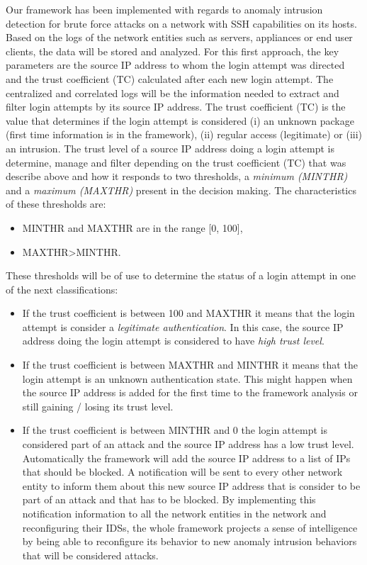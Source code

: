 \documentclass[conference]{IEEEtran}
\begin{document}
Our framework has been implemented with regards to anomaly intrusion detection for brute force attacks on a network with SSH capabilities on its hosts. Based on the logs of the network entities such as servers, appliances or end user clients, the data will be stored and analyzed. For this first approach, the key parameters are the source IP address to whom the login attempt was directed and the trust coefficient (TC) calculated after each new login attempt. The centralized and correlated logs will be the information needed to extract and filter login attempts by its source IP address. The trust coefficient (TC) is the value that determines if the login attempt is considered (i) an unknown package (first time information is in the framework), (ii) regular access (legitimate) or (iii) an intrusion. 
The trust level of a source IP address doing a login attempt is determine, manage and filter depending on the trust coefficient (TC) that was describe above and how it responds to two thresholds, a \emph{minimum (MINTHR)} and a \emph{maximum (MAXTHR)} present in the decision making. The characteristics of these thresholds are:
\begin{itemize}
\item MINTHR and MAXTHR are in the range [0, 100],
\item MAXTHR\textgreater MINTHR.
\end{itemize}
These thresholds will be of use to determine the status of a login attempt in one of the next classifications:
\begin{itemize}
\item If the trust coefficient is between 100 and MAXTHR it means that the login attempt is consider a \emph{legitimate authentication}. In this case, the source IP address doing the login attempt is considered to have \emph{high trust level}.
\item If the trust coefficient is between MAXTHR and MINTHR it means that the login attempt is an unknown authentication state. This might happen when the source IP address is added for the first time to the framework analysis or still gaining / losing its trust level.
\item If the trust coefficient is between MINTHR and 0 the login attempt is considered part of an attack and the source IP address has a low trust level. Automatically the framework will add the source IP address to a list of IPs that should be blocked. A notification will be sent to every other network entity to inform them about this new source IP address that is consider to be part of an attack and that has to be blocked. By implementing this notification information to all the network entities in the network and reconfiguring their IDSs, the whole framework projects a sense of intelligence by being able to reconfigure its behavior to new anomaly intrusion behaviors that will be considered attacks.
\end{itemize}
\end{document}
